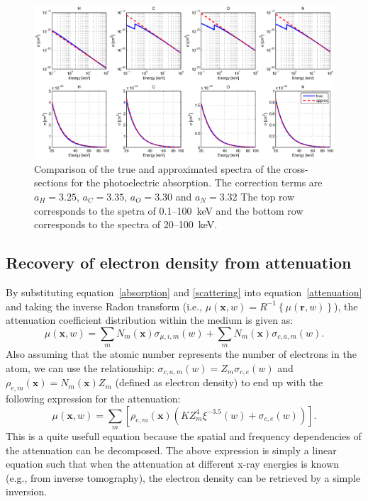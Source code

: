 \documentclass[12pt]{article}
\begin{document}
\begin{figure}
\centering
\includegraphics[width=1\textwidth]{imgs/validity2.eps}
\caption{Comparison of the true and approximated spectra of the cross-sections for the photoelectric absorption. The correction terms are $a_H=3.25$, $a_C=3.35$, $a_O=3.30$ and $a_N=3.32$ The top row corresponds to the spetra of 0.1--100~keV and the bottom row corresponds to the spectra of 20--100~keV.}
\label{validity2}
\end{figure}

\subsection{Recovery of electron density from attenuation}
By substituting equation~\ref{absorption} and \ref{scattering} into equation~\ref{attenuation} and taking the inverse Radon transform (i.e., $\mu(\textbf{x},w)=R^{-1}\left\lbrace\mu(\textbf{r},w)\right\rbrace$), the attenuation coefficient distribution within the medium is given as:
\begin{equation}
 \mu(\textbf{x},w) = \sum_m N_m(\textbf{x})\sigma_{\mu,i,m}(w) + \sum_m N_m(\textbf{x})\sigma_{c,a,m}(w). \label{mu}
\end{equation}
Also assuming that the atomic number represents the number of electrons in the atom, we can use the relationship: $\sigma_{c,a,m}(w)=Z_m\sigma_{c,e}(w)$ and $\rho_{e,m}(\textbf{x})=N_m(\textbf{x})Z_m$ (defined as electron density) to end up with the following expression for the attenuation:
\begin{equation}
 \mu(\textbf{x},w) = \sum_m \left[\rho_{e,m}(\textbf{x})\left(KZ^4_m\xi^{-3.5}(w) + \sigma_{c,e}(w)\right)\right].
\end{equation}
This is a quite usefull equation because the spatial and frequency dependencies of the attenuation can be decomposed. The above expression is simply a linear equation such that when the attenuation at different x-ray energies is known (e.g., from inverse tomography), the electron density can be retrieved by a simple inversion.
\end{document}
